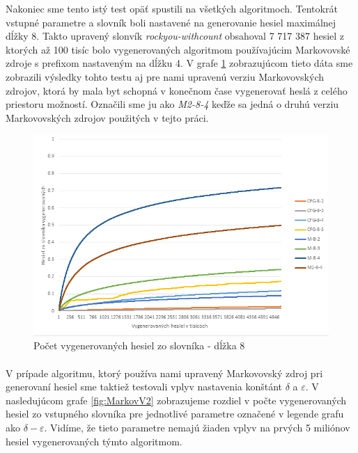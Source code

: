 Nakoniec sme tento istý test opäť spustili na všetkých algoritmoch. Tentokrát vstupné parametre a slovník boli nastavené na generovanie hesiel maximálnej dĺžky 8. Takto upravený slonvík \emph{rockyou-withcount} obsahoval 7 717 387 hesiel z ktorých až 100 tisíc bolo vygenerovaných algoritmom používajúcim Markovovské zdroje s prefixom nastaveným na dĺžku 4. V grafe \ref{fig:Acc8} zobrazujúcom tieto dáta sme zobrazili výsledky tohto testu aj pre nami upravenú verziu Markovovských zdrojov, ktorá by mala byt schopná v konečnom čase vygenerovať heslá z celého priestoru možností. Označili sme ju ako \emph{M2-8-4} keďže sa jedná o druhú verziu Markovovských zdrojov použitých v tejto práci.

\begin{figure}[ht]
    \centering
    \includegraphics[width=1\textwidth]{sameDictAcc8}
    \caption{Počet vygenerovaných hesiel zo slovníka - dĺžka 8}
    \label{fig:Acc8}
\end{figure}

\paragraph{}
V prípade algoritmu, ktorý používa nami upravený Markovovský zdroj pri generovaní hesiel sme taktiež testovali vplyv nastavenia konštánt \(\delta\) a \(\varepsilon\). V nasledujúcom grafe \ref{fig:MarkovV2} zobrazujeme rozdiel v počte vygenerovaných hesiel zo vstupného slovníka pre jednotlivé parametre označené v legende grafu ako \(\delta-\varepsilon\). Vidíme, že tieto parametre nemajú žiaden vplyv na prvých 5 miliónov hesiel vygenerovaných týmto algoritmom.

